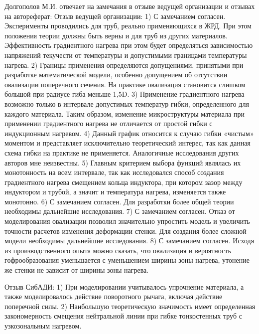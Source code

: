 Долгополов М.И. отвечает на замечания в отзыве ведущей организации и отзывах на автореферат:
Отзыв ведущей организации:
1) С замечанием согласен. Эксперименты проводились для труб, реально применяющихся в ЖРД. При этом положения теории должны быть верны и для труб из других материалов. Эффективность градиентного нагрева при этом будет определяться зависимостью напряжений текучести от температуры и допустимыми границами температуры нагрева.
2) Границы применения определяются допущениями, принятыми при разработке математической модели, особенно допущением об отсутствии овализации поперечного сечения. На практике овализация становится слишком большой при радиусе гиба меньше 1,5D.
3) Применение градиентного нагрева возможно только в интервале допустимых температур гибки, определенного для каждого материала. Таким образом, изменение микроструктуры материала при применении градиентного нагрева не отличается от простой гибки с индукционным нагревом.
4) Данный график относится к случаю гибки «чистым» моментом и представляет исключительно теоретический интерес, так как данная схема гибки на практике не применяется. Аналогичные исследования других авторов мне неизвестны.
5) Главным критерием выбора функций являлась их монотонность на всем интервале, так как исследовался способ создания градиентного нагрева смещением кольца индуктора, при котором зазор между индуктором и трубой, а значит и температура нагрева, изменяется также монотонно.
6) С замечанием согласен. Для разработки более общей теории необходимы дальнейшие исследования.
7) С замечанием согласен. Отказ от моделирования овализации позволил значительно упростить модель и увеличить точности расчетов изменения деформации стенки. Для создания более сложной модели необходимы дальнейшие исследования.
8) С замечанием согласен. Исходя из производственного опыта можно сказать, что овализация и вероятность гофрообразования уменьшается с уменьшением ширины зоны нагрева, утонение же стенки не зависит от ширины зоны нагрева.

Отзыв СибАДИ:
1) При моделировании учитывалось упрочнение материала, а также моделировалось действие поворотного рычага, включая действие поперечной силы.
2) Наибольшую теоретическую значимость имеет определенная закономерность смещения нейтральной линии при гибке тонкостенных труб с узкозональным нагревом.


